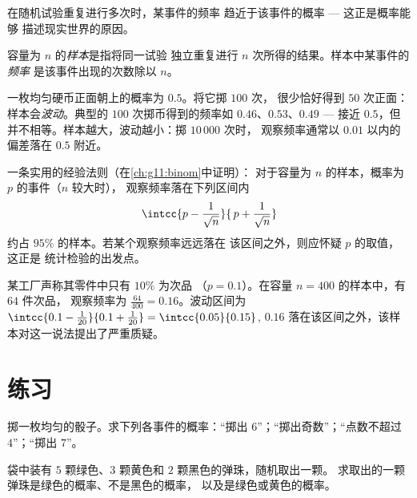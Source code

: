 在随机试验重复进行多次时，某事件的频率
趋近于该事件的概率 --- 这正是概率能够
描述现实世界的原因。

\begin{definition}[样本]\label{def:g10:proba:sample}
容量为 $n$ 的\emph{样本}是指将同一试验
独立重复进行 $n$ 次所得的结果。样本中某事件的\emph{频率}
是该事件出现的次数除以 $n$。
\end{definition}

\begin{example}\label{ex:g10:proba:sampling}
一枚均匀硬币正面朝上的概率为 $0.5$。将它掷 $100$ 次，
很少恰好得到 $50$ 次正面：样本会\emph{波动}。典型的
$100$ 次掷币得到的频率如 $0.46$、$0.53$、$0.49$ --- 接近
$0.5$，但并不相等。样本越大，波动越小：掷 $10\,000$ 次时，
观察频率通常以 $0.01$ 以内的偏差落在 $0.5$ 附近。
\end{example}

\begin{remark}[波动区间]
一条实用的经验法则（在\cref{ch:g11:binom}中证明）：
对于容量为 $n$ 的样本，概率为 $p$ 的事件（$n$ 较大时），
观察频率落在下列区间内
\[
\intcc{p - \frac{1}{\sqrt n}}{\,p + \frac{1}{\sqrt n}}
\]
约占 $95\%$ 的样本。若某个观察频率远远落在
该区间之外，则应怀疑 $p$ 的取值，这正是
统计检验的出发点。
\end{remark}

\begin{example}\label{ex:g10:proba:test}
某工厂声称其零件中只有 $10\%$ 为次品
（$p = 0.1$）。在容量 $n = 400$ 的样本中，有 $64$ 件次品，
观察频率为 $\frac{64}{400} = 0.16$。波动区间为
$\intcc{0.1 - \frac{1}{20}}{0.1 + \frac{1}{20}} = \intcc{0.05}{0.15}$,
$0.16$ 落在该区间之外，该样本对这一说法提出了严重质疑。
\end{example}

\section{练习}

\begin{exercise}[$\star$]\label{exo:g10:proba:1}
掷一枚均匀的骰子。求下列各事件的概率：“掷出
$6$”；“掷出奇数”；“点数不超过 $4$”；“掷出
$7$”。
\end{exercise}

\begin{exercise}[$\star$]\label{exo:g10:proba:2}
袋中装有 $5$ 颗绿色、$3$ 颗黄色和 $2$ 颗黑色的弹珠，随机取出一颗。
求取出的一颗弹珠是绿色的概率、不是黑色的概率，
以及是绿色或黄色的概率。
\end{exercise}

